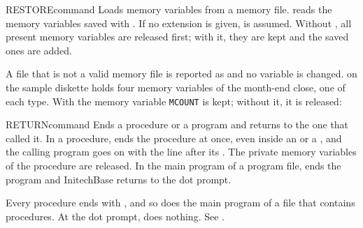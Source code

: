 \begin{XbaseEntry}{RESTORE}{command}
Loads memory variables from a memory file.
\Syntax
{}
\Usage
{} reads the memory variables saved with .  If no
extension is given,  is assumed.  Without , all
present memory variables are released first; with it, they are kept and the
saved ones are added.

A file that is not a valid memory file is reported as
 and no variable is changed.
\Examples
{} on the sample diskette holds four memory variables of the
month-end close, one of each type.  With  the memory variable
\texttt{MCOUNT} is kept; without it, it is released:
\end{XbaseEntry}

\begin{XbaseEntry}{RETURN}{command}
Ends a procedure or a program and returns to the one that called it.
\Syntax
{}
\Usage
In a procedure,  ends the procedure at once, even inside an
 or a , and the calling program goes on with the line
after its .  The private memory variables of the procedure are
released.  In the main program of a program file,  ends the program
and InitechBase returns to the dot prompt.

Every procedure ends with , and so does the main program of a file
that contains procedures.  At the dot prompt,  does nothing.
\Examples
See .
\end{XbaseEntry}

